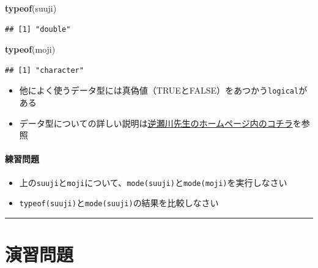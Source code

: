 \documentclass[
]{book}
\newenvironment{Shaded}{\begin{snugshade}}{\end{snugshade}}
\newcommand{\FunctionTok}[1]{\textcolor[rgb]{0.13,0.29,0.53}{\textbf{#1}}}
\newcommand{\NormalTok}[1]{#1}
\providecommand{\tightlist}{%
  \setlength{\itemsep}{0pt}\setlength{\parskip}{0pt}}
\begin{document}
\begin{Shaded}
\begin{Highlighting}[]
\FunctionTok{typeof}\NormalTok{(suuji)}
\end{Highlighting}
\end{Shaded}

\begin{verbatim}
## [1] "double"
\end{verbatim}

\begin{Shaded}
\begin{Highlighting}[]
\FunctionTok{typeof}\NormalTok{(moji)}
\end{Highlighting}
\end{Shaded}

\begin{verbatim}
## [1] "character"
\end{verbatim}

\begin{itemize}
\tightlist
\item
  他によく使うデータ型には真偽値（TRUEとFALSE）をあつかう\texttt{logical}がある
\item
  データ型についての詳しい説明は\href{http://www.f.waseda.jp/sakas/R/Rdata.html}{逆瀬川先生のホームページ内のコチラ}を参照
\end{itemize}

\hypertarget{ux7df4ux7fd2ux554fux984c-1}{%
\paragraph*{練習問題}\label{ux7df4ux7fd2ux554fux984c-1}}

\begin{itemize}
\tightlist
\item
  上の\texttt{suuji}と\texttt{moji}について、\texttt{mode(suuji)}と\texttt{mode(moji)}を実行しなさい
\item
  \texttt{typeof(suuji)}と\texttt{mode(suuji)}の結果を比較しなさい
\end{itemize}

\begin{center}\rule{0.5\linewidth}{0.5pt}\end{center}

\hypertarget{ux6f14ux7fd2ux554fux984c-1}{%
\section{演習問題}\label{ux6f14ux7fd2ux554fux984c-1}}
\end{document}
